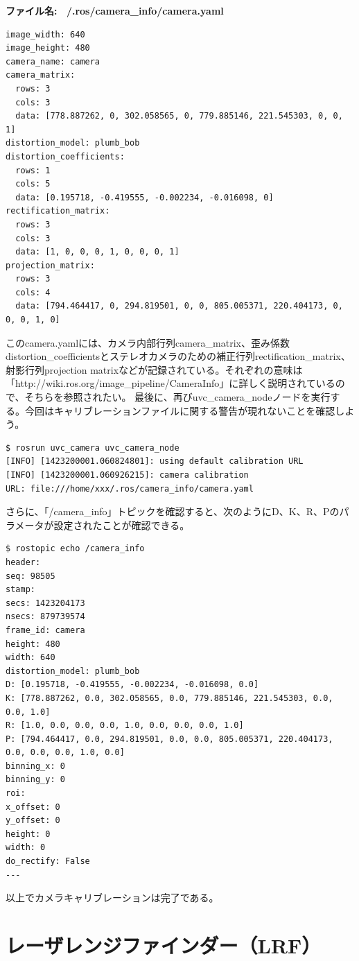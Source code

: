 \noindent\textbf{ファイル名: ~/.ros/camera\_info/camera.yaml}
\begin{lstlisting}[language=ROS]
image_width: 640
image_height: 480
camera_name: camera
camera_matrix:
  rows: 3
  cols: 3
  data: [778.887262, 0, 302.058565, 0, 779.885146, 221.545303, 0, 0, 1]
distortion_model: plumb_bob
distortion_coefficients:
  rows: 1
  cols: 5
  data: [0.195718, -0.419555, -0.002234, -0.016098, 0]
rectification_matrix:
  rows: 3
  cols: 3
  data: [1, 0, 0, 0, 1, 0, 0, 0, 1]
projection_matrix:
  rows: 3
  cols: 4
  data: [794.464417, 0, 294.819501, 0, 0, 805.005371, 220.404173, 0, 0, 0, 1, 0]
\end{lstlisting}

このcamera.yamlには、カメラ内部行列camera\_matrix、歪み係数distortion\_coefficientsとステレオカメラのための補正行列rectification\_matrix、射影行列projection matrixなどが記録されている。それぞれの意味は「http://wiki.ros.org/image\_pipeline/CameraInfo」に詳しく説明されているので、そちらを参照されたい。
最後に、再びuvc\_camera\_nodeノードを実行する。今回はキャリブレーションファイルに関する警告が現れないことを確認しよう。

\begin{lstlisting}[language=ROS]
$ rosrun uvc_camera uvc_camera_node
[INFO] [1423200001.060824801]: using default calibration URL
[INFO] [1423200001.060926215]: camera calibration
URL: file:///home/xxx/.ros/camera_info/camera.yaml
\end{lstlisting}

さらに、「/camera\_info」トピックを確認すると、次のようにD、K、R、Pのパラメータが設定されたことが確認できる。

\begin{lstlisting}[language=ROS]
$ rostopic echo /camera_info
header:
seq: 98505
stamp:
secs: 1423204173
nsecs: 879739574
frame_id: camera
height: 480
width: 640
distortion_model: plumb_bob
D: [0.195718, -0.419555, -0.002234, -0.016098, 0.0]
K: [778.887262, 0.0, 302.058565, 0.0, 779.885146, 221.545303, 0.0, 0.0, 1.0]
R: [1.0, 0.0, 0.0, 0.0, 1.0, 0.0, 0.0, 0.0, 1.0]
P: [794.464417, 0.0, 294.819501, 0.0, 0.0, 805.005371, 220.404173, 0.0, 0.0, 0.0, 1.0, 0.0]
binning_x: 0
binning_y: 0
roi:
x_offset: 0
y_offset: 0
height: 0
width: 0
do_rectify: False
---
\end{lstlisting}

以上でカメラキャリブレーションは完了である。

\section{レーザレンジファインダー（LRF）}

